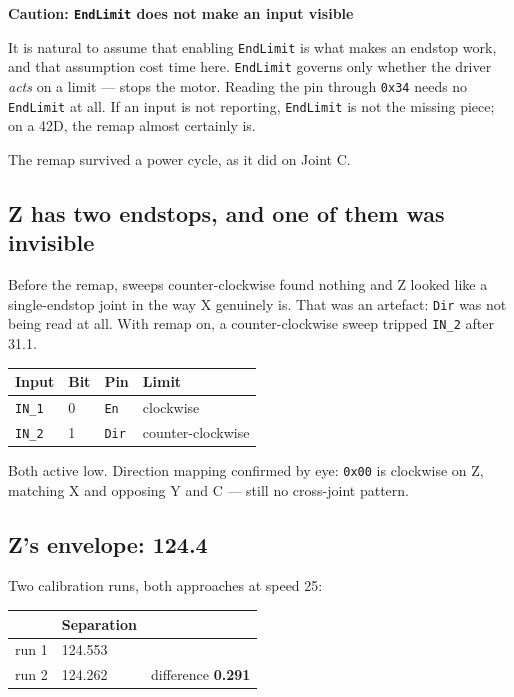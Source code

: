\documentclass[11pt,letterpaper]{article}
\newenvironment{caution}[1]{%
    \par\addvspace{8pt}%
    \noindent{\color{cautionred}\rule{\linewidth}{0.8pt}}\par\vspace{2pt}
    \noindent\textbf{\color{cautionred}Caution: #1}\par\vspace{2pt}
}{%
    \par\vspace{2pt}\noindent{\color{cautionred}\rule{\linewidth}{0.4pt}}%
    \par\addvspace{8pt}%
}
\begin{document}
\begin{caution}{\texttt{EndLimit} does not make an input visible}
It is natural to assume that enabling \texttt{EndLimit} is what makes an endstop
work, and that assumption cost time here. \texttt{EndLimit} governs only whether
the driver \emph{acts} on a limit --- stops the motor. Reading the pin through
\texttt{0x34} needs no \texttt{EndLimit} at all. If an input is not reporting,
\texttt{EndLimit} is not the missing piece; on a 42D, the remap almost certainly
is.
\end{caution}

The remap survived a power cycle, as it did on Joint C.

\subsection{Z has two endstops, and one of them was invisible}
Before the remap, sweeps counter-clockwise found nothing and Z looked like a
single-endstop joint in the way X genuinely is. That was an artefact:
\texttt{Dir} was not being read at all. With remap on, a counter-clockwise sweep
tripped \texttt{IN\_2} after 31.1\textdegree{}.

\begin{center}
\begin{tabular}{llll}
\toprule
\textbf{Input} & \textbf{Bit} & \textbf{Pin} & \textbf{Limit} \\ \midrule
\texttt{IN\_1} & 0 & \texttt{En}  & clockwise \\
\texttt{IN\_2} & 1 & \texttt{Dir} & counter-clockwise \\
\bottomrule
\end{tabular}
\end{center}

Both active low. Direction mapping confirmed by eye: \texttt{0x00} is clockwise
on Z, matching X and opposing Y and C --- still no cross-joint pattern.

\subsection{Z's envelope: 124.4\textdegree{}}
Two calibration runs, both approaches at speed 25:

\begin{center}
\begin{tabular}{lll}
\toprule
 & \textbf{Separation} & \\ \midrule
run 1 & 124.553\textdegree{} & \\
run 2 & 124.262\textdegree{} & difference \textbf{0.291\textdegree{}} \\
\bottomrule
\end{tabular}
\end{center}
\end{document}
